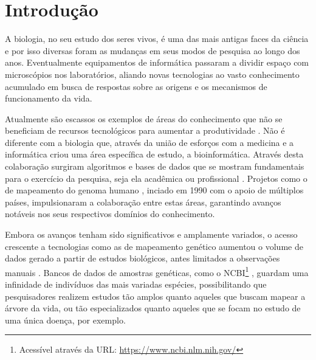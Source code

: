 \documentclass[english,brazilian]{UNISINOSmonografia} %
\begin{document}

\begingroup
\hypersetup{linkcolor=defaultcolor}
	\tableofcontents
\endgroup

\chapter{Introdução}
\label{ch:intro}



A biologia, no seu estudo dos seres vivos, é uma das mais antigas faces da ciência e por isso diversas foram as mudanças em seus modos de pesquisa ao longo dos anos.
Eventualmente equipamentos de informática passaram a dividir espaço com microscópios nos laboratórios, aliando novas tecnologias ao vasto conhecimento acumulado em busca de respostas sobre as origens e os mecanismos de funcionamento da vida.


Atualmente são escassos os exemplos de áreas do conhecimento que não se beneficiam de recursos tecnológicos para aumentar a produtividade \cite{Denning2009}.
Não é diferente com a biologia que, através da união de esforços com a medicina e a informática criou uma área específica de estudo, a bioinformática.
Através desta colaboração surgiram algoritmos e bases de dados que se mostram fundamentais para o exercício da pesquisa, seja ela acadêmica ou profissional \cite{NCBI-Handbook}.
Projetos como o de mapeamento do genoma humano \cite{Venter2001}, inciado em 1990 com o apoio de múltiplos países, impulsionaram a colaboração entre estas áreas, garantindo avanços notáveis nos seus respectivos domínios do conhecimento.


Embora os avanços tenham sido significativos e amplamente variados, o acesso crescente a tecnologias como as de mapeamento genético aumentou o volume de dados gerado a partir de estudos biológicos, antes limitados a observações manuais \cite{book:2119998}.
Bancos de dados de amostras genéticas, como o NCBI\footnote{
	Acessível através da URL: \url{https://www.ncbi.nlm.nih.gov/}
} \cite{NCBI-Handbook}, guardam uma infinidade de indivíduos das mais variadas espécies, possibilitando que pesquisadores realizem estudos tão amplos quanto aqueles que buscam mapear a árvore da vida, ou tão especializados quanto aqueles que se focam no estudo de uma única doença, por exemplo.
\end{document}
